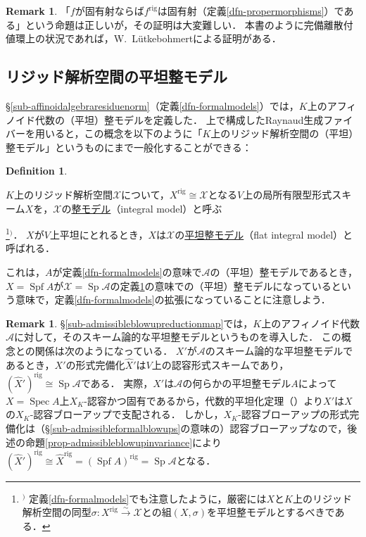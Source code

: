 \documentclass[a4paper,12pt, dvipdfmx]{jsbook}
\def\rig{\mathop{\mathrm{rig}}\nolimits}
\def\Spec{\mathop{\mathrm{Spec}}\nolimits}
\def\Spf{\mathop{\mathrm{Spf}}\nolimits}
\def\Sp{\mathop{\mathrm{Sp}}\nolimits}
\theoremstyle{plain}
\theoremstyle{definition}
\newtheorem{rem}[thm]{\bfseries Remark}
\newtheorem{dfn}[thm]{\bfseries Definition}
\newcounter{chushaku}
\def\chu#1{\addtocounter{chushaku}{1}\footnote[\value{chushaku}]{${}^)$ #1}${}^)$}
\begin{document}
\begin{rem}\label{rem-basicpropertyRaynaudgenericfiber2}{\rm 
「$f$が固有射ならば$f^{\rig}$は固有射（定義\ref{dfn-propermorphisms}）である」という命題は正しいが，その証明は大変難しい．
本書のように完備離散付値環上の状況であれば，W.\ L\"utkebohmertによる証明\cite{Lutk1}がある．}
\end{rem}

\subsection{リジッド解析空間の平坦整モデル}\label{sub-integralmodelrigid}
\S\ref{sub-affinoidalgebraresiduenorm}（定義\ref{dfn-formalmodels}）では，$K$上のアフィノイド代数の（平坦）整モデルを定義した．
上で構成したRaynaud生成ファイバーを用いると，この概念を以下のように「$K$上のリジッド解析空間の（平坦）整モデル」というものにまで一般化することができる：
\begin{dfn}\label{dfn-integralmodelrigid}{\rm 
$K$上のリジッド解析空間$\mathcal{X}$について，$X^{\rig}\cong\mathcal{X}$となる$V$上の局所有限型形式スキーム$X$を，$\mathcal{X}$の\underline{整モデル}（integral model）と呼ぶ\chu{定義\ref{dfn-formalmodels}でも注意したように，厳密には$X$と$K$上のリジッド解析空間の同型$\sigma\colon X^{\rig}\stackrel{\sim}{\rightarrow}\mathcal{X}$との組$(X,\sigma)$を平坦整モデルとするべきである．}．
$X$が$V$上平坦にとれるとき，$X$は$\mathcal{X}$の\underline{平坦整モデル}（flat integral model）と呼ばれる．}
\end{dfn}

これは，$A$が定義\ref{dfn-formalmodels}の意味で$\mathcal{A}$の（平坦）整モデルであるとき，$X=\Spf A$が$\mathcal{X}=\Sp\mathcal{A}$の定義\ref{dfn-integralmodelrigid}の意味での（平坦）整モデルになっているという意味で，定義\ref{dfn-formalmodels}の拡張になっていることに注意しよう．

\begin{rem}\label{rem-integralmodelrigid}{\rm 
\S\ref{sub-admissibleblowupreductionmap}では，$K$上のアフィノイド代数$\mathcal{A}$に対して，そのスキーム論的な平坦整モデルというものを導入した．
この概念との関係は次のようになっている．
$X'$が$\mathcal{A}$のスキーム論的な平坦整モデルであるとき，$X'$の形式完備化$\widehat{X}'$は$V$上の認容形式スキームであり，$(\widehat{X}')^{\rig}\cong\Sp\mathcal{A}$である．
実際，$X'$は$\mathcal{A}$の何らかの平坦整モデル$A$によって$X=\Spec A$上$X_K$-認容かつ固有であるから，代数的平坦化定理（\cite[Premi\`ere partie, (5.7.11)]{RG}）より$X'$は$X$の$X_K$-認容ブローアップで支配される．
しかし，$X_K$-認容ブローアップの形式完備化は（\S\ref{sub-admissibleformalblowups}の意味の）認容ブローアップなので，後述の命題\ref{prop-admissibleblowupinvariance}により$(\widehat{X}')^{\rig}\cong\widehat{X}^{\rig}=(\Spf A)^{\rig}=\Sp\mathcal{A}$となる．}
\end{rem}
\end{document}
